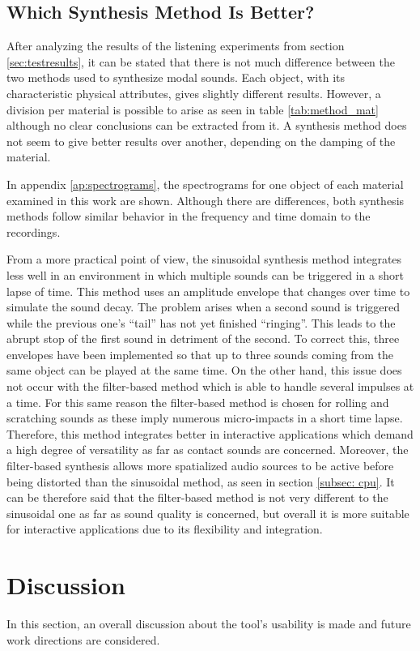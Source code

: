 \subsection{Which Synthesis Method Is Better?}
After analyzing the results of the listening experiments from section \ref{sec:testresults}, it can be stated that there is not much difference between the two methods used to synthesize modal sounds. Each object, with its characteristic physical attributes, gives slightly different results. However, a division per material is possible to arise as seen in table \ref{tab:method_mat} although no clear conclusions can be extracted from it. A synthesis method does not seem to give better results over another, depending on the damping of the material.

In appendix \ref{ap:spectrograms}, the spectrograms for one object of each material examined in this work are shown. Although there are differences, both synthesis methods follow similar behavior in the frequency and time domain to the recordings.

From a more practical point of view, the sinusoidal synthesis method integrates less well in an environment in which multiple sounds can be triggered in a short lapse of time. This method uses an amplitude envelope that changes over time to simulate the sound decay. The problem arises when a second sound is triggered while the previous one's ``tail'' has not yet finished ``ringing''. This leads to the abrupt stop of the first sound in detriment of the second. To correct this, three envelopes have been implemented so that up to three sounds coming from the same object can be played at the same time. On the other hand, this issue does not occur with the filter-based method which is able to handle several impulses at a time. For this same reason the filter-based method is chosen for rolling and scratching sounds as these imply numerous micro-impacts in a short time lapse. Therefore, this method integrates better in interactive applications which demand a high degree of versatility as far as contact sounds are concerned. Moreover,  the filter-based synthesis allows more spatialized audio sources to be active before being distorted than the sinusoidal method, as seen in section \ref{subsec: cpu}. It can be therefore said that the filter-based method is not very different to the sinusoidal one as far as sound quality is concerned, but overall it is more suitable for interactive applications due to its flexibility and integration.


\section{Discussion}
In this section, an overall discussion about the tool's usability is made and future work directions are considered.


